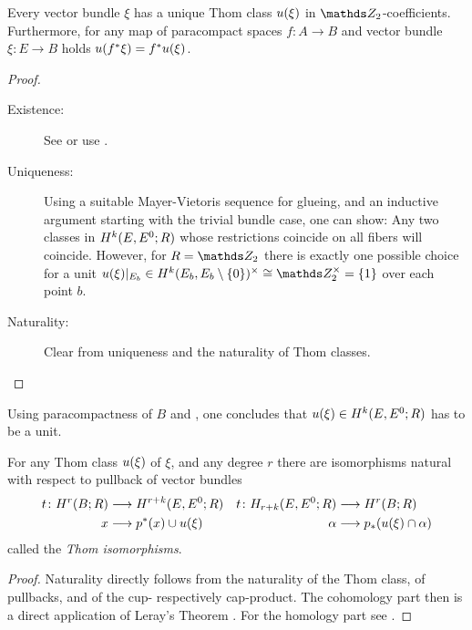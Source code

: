 \begin{Thm}
  Every vector bundle $\xi$ has a unique Thom class ${u}(\xi)$ in
  $\Zmod2$-coefficients.
  Furthermore, for any map of paracompact spaces $f\colon A\to B$ and
  vector bundle $\xi\colon E\to B$ holds ${u}({f}^* \xi) = {f}^* {u}(\xi)$.
  \begin{proof}
    \begin{description}
    \item[Existence:] See \cite[Theorem~4D.10]{hatcher} or use
      \cite[Proposition~17.9.3]{tomdieck}.
    \item[Uniqueness:] %
      Using a suitable Mayer-Vietoris sequence for glueing, and an
      inductive argument starting with the trivial bundle case, one can show:
      Any two classes in $H^{k}(E, {E}^0;R)$ whose
      restrictions coincide on all fibers will coincide.
      However, for $R=\Zmod2$ there is exactly one possible choice for
      a unit $\u{\xi}|_{E_b}\in
      \H^{\rkk}(\spherepair{E_b})^\times\cong\Zmod2^\times=\{1\}$
      over each point $b$.
    \item[Naturality:] Clear from uniqueness and the naturality of Thom classes.
    \end{description}
  \end{proof}
\end{Thm}

\begin{Rem}
  Using paracompactness of $B$ and
  \cite[Proposition~17.9.6]{tomdieck}, one concludes that
  ${u}(\xi)\in H^{k}(E, {E}^0;R)$ has to be a unit.
\end{Rem}

\begin{Thm}
  For any Thom class ${u}(\xi)$ of $\xi$, and any degree $r$ there are
  isomorphisms natural with respect to pullback of vector bundles
  \begin{align*}
    t\colon
    H^r(B;R) &\longrightarrow H^{r+k}(E, {E}^0; R)
    & t\colon
      H_{r+k}(E, {E}^0; R) &\longrightarrow H^r(B;R)
    \\
    x &\longrightarrow {p}^* (x) \cup {u}(\xi)
    & \alpha &\longrightarrow {p}_* ({u}(\xi) \cap \alpha)
  \end{align*}
  called the \emph{Thom isomorphisms}.
  \begin{proof} %
    Naturality directly follows from the naturality of the Thom class,
    of pullbacks, and of the cup- respectively cap-product.
    The cohomology part then is a direct application of Leray's Theorem
    \cite[Theorem~4D.8]{hatcher}.
    For the homology part see \forexample \cite[Theorem~14.6]{switzer}.
  \end{proof}
\end{Thm}

